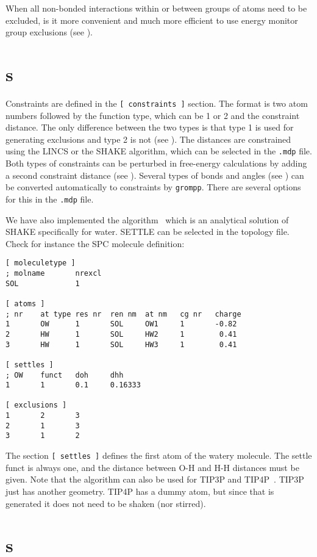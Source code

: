 When all non-bonded interactions within or between groups of atoms need
to be excluded, is it more convenient and much more efficient to use
energy monitor group exclusions (see ).

\section{s}
\label{sec:constraints}
Constraints are defined in the {\tt [~constraints~]} section.
The format is two atom numbers followed by the function type,
which can be 1 or 2 and the constraint distance.
The only difference between the two types is that type 1 is used
for generating exclusions and type 2 is not (see ).
The distances are constrained using the LINCS or the SHAKE algorithm,
which can be selected in the {\tt *.mdp} file.
Both types of constraints can be perturbed in free-energy calculations
by adding a second constraint distance (see ).
Several types of bonds and angles (see ) can
be converted automatically to constraints by {\tt grompp}.
There are several options for this in the {\tt *.mdp} file.

We have also implemented the  algorithm~\cite{Miyamoto92}
which is an analytical solution of SHAKE specifically for water. 
SETTLE can be selected in the topology file. Check for instance the
SPC molecule definition:
\begin{verbatim}
[ moleculetype ]
; molname       nrexcl
SOL             1

[ atoms ]
; nr    at type res nr  ren nm  at nm   cg nr   charge
1       OW      1       SOL     OW1     1       -0.82
2       HW      1       SOL     HW2     1        0.41
3       HW      1       SOL     HW3     1        0.41

[ settles ]
; OW    funct   doh     dhh
1       1       0.1     0.16333

[ exclusions ]
1       2       3
2       1       3
3       1       2
\end{verbatim}
The section {\tt [ settles ]} defines the first atom of the watery molecule.
The settle funct is always one, and the distance between O-H and H-H distances
must be given. Note that the algorithm can also be used
for TIP3P and TIP4P~\cite{Jorgensen83}.
TIP3P just has another geometry. TIP4P has a dummy atom, but since 
that is generated it does not need to be shaken (nor stirred).

\section{s}

